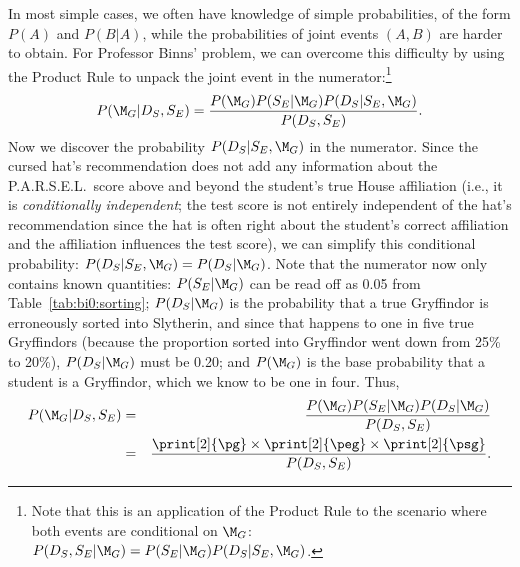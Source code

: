 In most simple cases, we often have knowledge of simple probabilities, of the form $P(A)$ and $P(B|A)$, while the probabilities of joint events $(A,B)$ are harder to obtain. For Professor Binns' problem, we can overcome this difficulty by using the Product Rule to unpack the joint event in the numerator:\footnote{Note that this is an application of the Product Rule to the scenario where both events are conditional on $\M_G$: $P(D_S,S_E|\M_G) = P(S_E|\M_G)P(D_S|S_E,\M_G)$.}
$$P(\M_G|D_S,S_E) = \frac{P(\M_G)P(S_E|\M_G)P(D_S|S_E,\M_G)}{P(D_S,S_E)}.$$
Now we discover the probability $P(D_S|S_E,\M_G)$ in the numerator.  Since {the cursed hat's recommendation does not add any information about the P.A.R.S.E.L.\ score above and beyond the student's true House affiliation (i.e., it is \emph{conditionally independent}; the test score is not entirely independent of the hat's recommendation since the hat is often right about the student's correct affiliation and the affiliation influences the test score)}, we can simplify this conditional probability: $P(D_S|S_E,\M_G) = P(D_S|\M_G)$. Note that the numerator now only contains known quantities: $P(S_E|\M_G)$ can be read off as 0.05 from Table~\ref{tab:bi0:sorting}; $P(D_S|\M_G)$ is the probability that a true Gryffindor is erroneously sorted into Slytherin, and since that happens to one in five true Gryffindors (because the proportion sorted into Gryffindor went down from 25\% to 20\%), $P(D_S|\M_G)$ must be 0.20; and $P(\M_G)$ is the base probability that a student is a Gryffindor, which we know to be one in four. Thus,
\begin{eqnarray*}
P(\M_G|D_S,S_E) &=& \frac{P(\M_G)P(S_E|\M_G)P(D_S|\M_G)}{P(D_S,S_E)} \\  
& = & \frac{\print[2]{\pg} \times \print[2]{\peg} \times \print[2]{\psg}}{P(D_S,S_E)}.
\end{eqnarray*}

